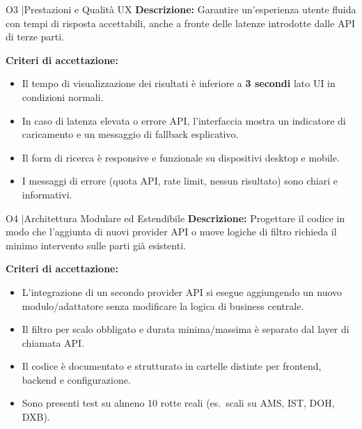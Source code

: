 \documentclass[a4paper, 11pt]{article}
\begin{document}
\begin{objectivebox}[colframe=black,colbacktitle=black]{O3 \quad|\quad Prestazioni e Qualit\`a UX}
\textbf{Descrizione:} Garantire un'esperienza utente fluida con tempi di risposta accettabili, anche a fronte delle latenze introdotte dalle API di terze parti.

\vspace{6pt}
\textbf{Criteri di accettazione:}
\begin{itemize}
  \item Il tempo di visualizzazione dei risultati \`e inferiore a \textbf{3 secondi} lato UI in condizioni normali.
  \item In caso di latenza elevata o errore API, l'interfaccia mostra un indicatore di caricamento e un messaggio di fallback esplicativo.
  \item Il form di ricerca \`e responsive e funzionale su dispositivi desktop e mobile.
  \item I messaggi di errore (quota API, rate limit, nessun risultato) sono chiari e informativi.
\end{itemize}
\end{objectivebox}

\vspace{8pt}

\begin{objectivebox}[colframe=black,colbacktitle=black]{O4 \quad|\quad Architettura Modulare ed Estendibile}
\textbf{Descrizione:} Progettare il codice in modo che l'aggiunta di nuovi provider API o nuove logiche di filtro richieda il minimo intervento sulle parti gi\`a esistenti.

\vspace{6pt}
\textbf{Criteri di accettazione:}
\begin{itemize}
  \item L'integrazione di un secondo provider API si esegue aggiungendo un nuovo modulo/adattatore senza modificare la logica di business centrale.
  \item Il filtro per scalo obbligato e durata minima/massima \`e separato dal layer di chiamata API.
  \item Il codice \`e documentato e strutturato in cartelle distinte per frontend, backend e configurazione.
  \item Sono presenti test su almeno 10 rotte reali (es.\ scali su AMS, IST, DOH, DXB).
\end{itemize}
\end{objectivebox}
\end{document}
